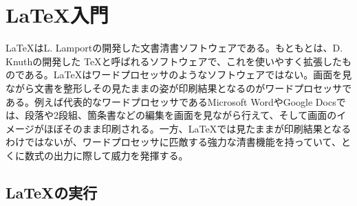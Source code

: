 \chapter{\LaTeX 入門}

\noindent
\LaTeX はL. Lamportの開発した文書清書ソフトウェアである。もともとは、D. Knuthの開発した \TeX と呼ばれるソフトウェアで、これを使いやすく拡張したものである。\LaTeX はワードプロセッサのようなソフトウェアではない。画面を見ながら文書を整形しその見たままの姿が印刷結果となるのがワードプロセッサである。例えば代表的なワードプロセッサであるMicrosoft WordやGoogle Docsでは、段落や2段組、箇条書などの編集を画面を見ながら行えて、そして画面のイメージがほぼそのまま印刷される。一方、\LaTeX では見たままが印刷結果となるわけではないが、ワードプロセッサに匹敵する強力な清書機能を持っていて、とくに数式の出力に際して威力を発揮する。

\section{\LaTeX の実行}
\label{sec:latex:intro}

